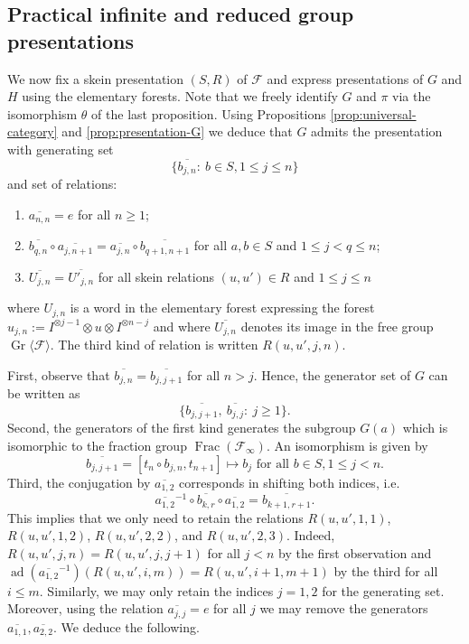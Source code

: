 \documentclass[a4paper, 12pt]{amsart}
\numberwithin{equation}{section}
\theoremstyle{definition}
\DeclareMathOperator{\ad}{ad}
\newcommand{\cF}{\mathcal F}
\DeclareMathOperator{\Frac}{Frac}
\DeclareMathOperator{\Gr}{Gr}
\newcommand{\la}{\langle}
\newcommand{\ot}{\otimes}
\newcommand{\ov}{\overline}
\newcommand{\ra}{\rangle}
\begin{document}
\subsection{Practical infinite and reduced group presentations}\label{sec:practical-presentation}
We now fix a skein presentation $(S,R)$ of $\cF$ and express presentations of $G$ and $H$ using the elementary forests.
Note that we freely identify $G$ and $\pi$ via the isomorphism $\theta$ of the last proposition.
Using Propositions \ref{prop:universal-category} and \ref{prop:presentation-G} we deduce that $G$ admits the presentation with generating set 
$$\{ \ov{b_{j,n}}:\ b\in S, 1\leq j\leq n\}$$
and set of relations:
\begin{enumerate}
\item $\ov{a_{n,n}}=e$ for all $n\geq 1$;
\item $\ov{b_{q,n}}\circ \ov{a_{j,n+1}} =  \ov{a_{j,n}}\circ \ov{b_{q+1,n+1}}$ for all  $a,b\in S$ and $1\leq j <q\leq n$;
\item $\ov{U_{j,n}}=\ov{U'_{j,n}}$ for all skein relations $(u,u')\in R$ and $1\leq j\leq n$
\end{enumerate}
where $U_{j,n}$ is a word in the elementary forest expressing the forest $u_{j,n}:= I^{\ot j-1}\ot u\ot I^{\ot n-j}$ and where $\ov{U_{j,n}}$ denotes its image in the free group $\Gr\la \cF\ra$.
The third kind of relation is written $R(u,u',j,n)$.

First, observe that $\ov{b_{j,n}} = \ov{b_{j,j+1}}$ for all $n>j$. 
Hence, the generator set of $G$ can be written as
$$\{\ov{b_{j,j+1}}, \ \ov{b_{j,j}} :\ j\geq 1\}.$$
Second, the generators of the first kind generates the subgroup $G(a)$ which is isomorphic to the fraction group $\Frac(\cF_\infty).$
An isomorphism is given by $$\ov{b_{j,j+1}}=[t_n \circ b_{j,n}, t_{n+1}]\mapsto b_j \text{ for all } b\in S, 1\leq j <n.$$
Third, the conjugation by $\ov{a_{1,2}}$ corresponds in shifting both indices, i.e.~
$$\ov{a_{1,2}}^{-1} \circ \ov{b_{k,r}} \circ \ov{a_{1,2}} = \ov{b_{k+1,r+1}}.$$
This implies that we only need to retain the relations $R(u,u',1,1)$, $R(u,u',1,2)$, $R(u,u',2,2)$, and  
$R(u,u',2,3)$.
Indeed, $R(u,u',j,n)=R(u,u',j,j+1)$ for all $j<n$ by the first observation and $\ad(\ov{a_{1,2}}^{-1})(R(u,u',i,m))=R(u,u',i+1,m+1)$ by the third for all $i\leq m$.
Similarly, we may only retain the indices $j=1,2$ for the generating set. 
Moreover, using the relation $\ov{a_{j,j}}=e$ for all $j$ we may remove the generators $\ov{a_{1,1}},\ov{a_{2,2}}.$
We deduce the following.
\end{document}
